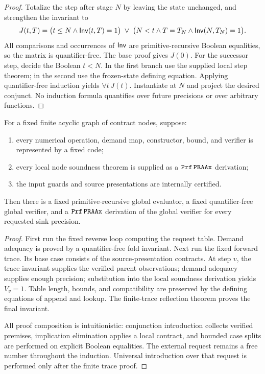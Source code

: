 \begin{proof}
Totalize the step after stage \(N\) by leaving the state unchanged, and
strengthen the invariant to
\[
   J(t,T)=
   \bigl(t\le N\wedge \mathsf{Inv}(t,T)=1\bigr)
   \;\vee\;
   \bigl(N<t\wedge T=T_N\wedge\mathsf{Inv}(N,T_N)=1\bigr).
\]
All comparisons and occurrences of \(\mathsf{Inv}\) are primitive-recursive Boolean
equalities, so the matrix is quantifier-free.  The base proof gives \(J(0)\).
For the successor step, decide the Boolean \(t<N\).  In the first branch use
the supplied local step theorem; in the second use the frozen-state defining
equation.  Applying quantifier-free induction yields \(\forall t\,J(t)\).
Instantiate at \(N\) and project the desired conjunct.  No induction formula
quantifies over future precisions or over arbitrary functions.
\end{proof}

\begin{theorem}
For a fixed finite acyclic graph of contract nodes, suppose:
\begin{enumerate}[label=(\arabic*)]
\item every numerical operation, demand map, constructor, bound, and verifier
      is represented by a fixed  code;
\item every local node soundness theorem is supplied as a
      \(\mathtt{Prf}\,\mathtt{PRAAx}\) derivation;
\item the input guards and source presentations are internally certified.
\end{enumerate}
Then there is a fixed primitive-recursive global evaluator, a fixed
quantifier-free global verifier, and a \(\mathtt{Prf}\,\mathtt{PRAAx}\) derivation of the
global verifier for every requested sink precision.
\end{theorem}

\begin{proof}
First run the fixed reverse loop computing the request table.  Demand adequacy
is proved by a quantifier-free fold invariant.  Next run the fixed forward
trace.  Its base case consists of the source-presentation contracts.  At step
\(v\), the trace invariant supplies the verified parent observations;
demand adequacy supplies enough precision; substitution into the local
soundness derivation yields \(V_v=1\).  Table length, bounds, and compatibility
are preserved by the defining equations of append and lookup.  The
finite-trace reflection theorem proves the final invariant.

All proof composition is intuitionistic: conjunction introduction collects
verified premises, implication elimination applies a local contract, and
bounded case splits are performed on explicit Boolean equalities.  The
external request remains a free number throughout the induction.  Universal
introduction over that request is performed only after the finite trace proof.
\end{proof}


